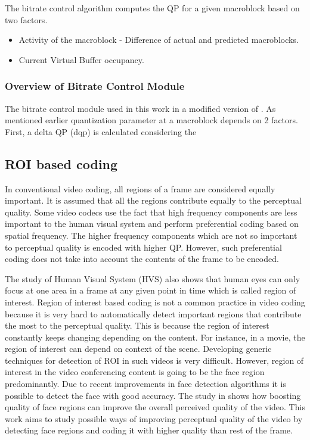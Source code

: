 \documentclass[11pt]{article} %
\begin{document}
The bitrate control algorithm computes the QP for a given macroblock based on two factors. 
\begin{itemize}  
\item Activity of the macroblock - Difference of actual and predicted macroblocks.
\item Current Virtual Buffer occupancy.
\end{itemize}

\subsubsection{Overview of Bitrate Control Module}
	The bitrate control module used in this work in a modified version of \cite{JVTF086}. As mentioned earlier quantization parameter at a macroblock depends on 2 factors. First, a delta QP (dqp) is calculated considering the

  \subsection{ROI based coding}
	In conventional video coding, all regions of a frame are considered equally important. It is assumed that all the regions contribute equally to the perceptual quality. Some video codecs use the fact that high frequency components are less important to the human visual system and perform preferential coding based on spatial frequency. The higher frequency components which are not so important to perceptual quality is encoded with higher QP. However, such preferential coding does not take into account the contents of the frame to be encoded. 

The study of Human Visual System (HVS) also shows that human eyes can only focus at one area in a frame at any given point in time which is called region of interest. Region of interest based coding is not a common practice in video coding because it is very hard to automatically detect important regions that contribute the most to the perceptual quality. This is because the region of interest constantly keeps changing depending on the content. For instance, in a movie, the region of interest can depend on context of the scene. Developing generic techniques for detection of ROI in such videos is very difficult. However, region of interest in the video conferencing content is going to be the face region predominantly. Due to recent improvements in face detection algorithms it is possible to detect the face with good accuracy. The study in \cite{HighQualityROICodingForVideoConferencing} shows how boosting quality of face regions can improve the overall perceived quality of the video. This work aims to study possible ways of improving perceptual quality of the video by detecting face regions and coding it with higher quality than rest of the frame.
\end{document}
